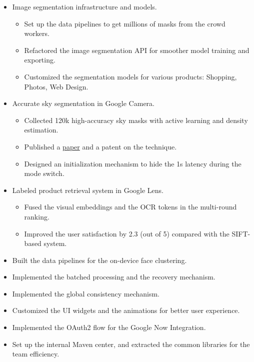 \documentclass[letterpaper,11pt]{article}
\begin{document}
\begin{itemize}
  \begin{itemize}
    
    \item Image segmentation infrastructure and models.
    \begin{itemize}
      \item Set up the data pipelines to get millions of masks from the crowd workers.
      \item Refactored the image segmentation API for smoother model training and exporting.
      \item Customized the segmentation models for various products: Shopping, Photos, Web Design.
    \end{itemize}
    
    \item Accurate sky segmentation in Google Camera.
    \begin{itemize}
      \item Collected 120k high-accuracy sky masks with active learning and density estimation.
      \item Published a \href{https://google.github.io/sky-optimization/}{paper} and a patent on the technique.
      \item Designed an initialization mechanism to hide the 1s latency during the mode switch.
    \end{itemize}
    
    \item Labeled product retrieval system in Google Lens.
    \begin{itemize}
      \item Fused the visual embeddings and the OCR tokens in the multi-round ranking.
      \item Improved the user satisfaction by 2.3 (out of 5) compared with the SIFT-based system.
    \end{itemize}
  \end{itemize}

  \begin{itemize}
  \item Built the data pipelines for the on-device face clustering.
  \item Implemented the batched processing and the recovery mechanism.
  \item Implemented the global consistency mechanism.
  \end{itemize}

  \begin{itemize}
  \item Customized the UI widgets and the animations for better user experience.
  \item Implemented the OAuth2 flow for the Google Now Integration.
  \item Set up the internal Maven center, and extracted the common libraries for the team efficiency.
  \end{itemize}
\end{itemize}
\end{document}
